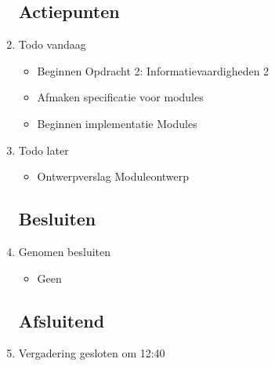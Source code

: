 \documentclass{article}
\begin{document}
\begin{enumerate}
	\subsection*{Actiepunten}
	\item Todo vandaag
	\begin{itemize}
		\item	Beginnen Opdracht 2: Informatievaardigheden 2
		\item	Afmaken specificatie voor modules
		\item	Beginnen implementatie Modules
		
	\end{itemize}
	\item Todo later
	\begin{itemize}
		\item	Ontwerpverslag Moduleontwerp
	\end{itemize}

	\subsection*{Besluiten}
	\item Genomen besluiten
	\begin{itemize}
		\item Geen
	\end{itemize}

	\noindent 
	\subsection*{Afsluitend}
	\item Vergadering gesloten om 12:40%

\end{enumerate}
\end{document}
